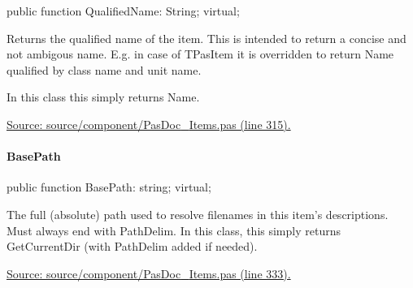 \documentclass{report}
\newif\ifpdf
\begin{document}
\label{PasDoc_Items.TBaseItem-QualifiedName}
\begin{list}{}{
\setlength{\itemindent}{0cm}
\setlength{\listparindent}{0cm}
\setlength{\leftmargin}{\evensidemargin}
\addtolength{\leftmargin}{\tmplength}
\settowidth{\labelsep}{X}
\addtolength{\leftmargin}{\labelsep}
\setlength{\labelwidth}{\tmplength}
}
\item[\textbf{Declaration}\hfill]
\ifpdf
\begin{flushleft}
\fi
\begin{ttfamily}
public function QualifiedName: String; virtual;\end{ttfamily}

\ifpdf
\end{flushleft}
\fi

\par
\item[\textbf{Description}]
Returns the qualified name of the item. This is intended to return a concise and not ambigous name. E.g. in case of TPasItem it is overridden to return Name qualified by class name and unit name.

In this class this simply returns Name.\par
\href{https://github.com/pasdoc/pasdoc/blob/master/source/component/PasDoc_Items.pas#L315}{Source: source/component/PasDoc{\_}Items.pas (line 315).}

\end{list}
\paragraph*{BasePath}\hspace*{\fill}

\label{PasDoc_Items.TBaseItem-BasePath}
\begin{list}{}{
\setlength{\itemindent}{0cm}
\setlength{\listparindent}{0cm}
\setlength{\leftmargin}{\evensidemargin}
\addtolength{\leftmargin}{\tmplength}
\settowidth{\labelsep}{X}
\addtolength{\leftmargin}{\labelsep}
\setlength{\labelwidth}{\tmplength}
}
\item[\textbf{Declaration}\hfill]
\ifpdf
\begin{flushleft}
\fi
\begin{ttfamily}
public function BasePath: string; virtual;\end{ttfamily}

\ifpdf
\end{flushleft}
\fi

\par
\item[\textbf{Description}]
The full (absolute) path used to resolve filenames in this item's descriptions. Must always end with PathDelim. In this class, this simply returns GetCurrentDir (with PathDelim added if needed).\par
\href{https://github.com/pasdoc/pasdoc/blob/master/source/component/PasDoc_Items.pas#L333}{Source: source/component/PasDoc{\_}Items.pas (line 333).}

\end{list}
\end{document}
